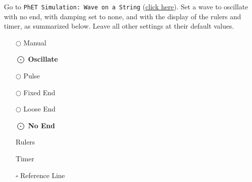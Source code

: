 \documentclass[../main-physics-problems.tex]{subfiles}
\begin{document}
\begin{questions}
\question
Go to \texttt{PhET Simulation: Wave on a String} (\href{https://phet.colorado.edu/sims/html/wave-on-a-string/latest/wave-on-a-string_all.html}{click here}). Set a wave to oscillate with no end, with damping set to none, and with the display of the rulers and timer, as summarized below. Leave all other settings at their default values.

\begin{center}
\begin{minipage}{0.15\textwidth}
\begin{itemize}
    \item[$\bigcirc$] Manual 
    \item[$\bigodot$] \textbf{Oscillate}
    \item[$\bigcirc$] Pulse
\end{itemize}
\end{minipage}%
\hspace{1ex}
\begin{minipage}{0.3\textwidth}
\centering
{}
\end{minipage}%
\hspace{1ex}
\begin{minipage}{0.15\textwidth}
\centering
\begin{itemize}
    \item[$\bigcirc$] Fixed End 
    \item[$\bigcirc$] Loose End
    \item[$\bigodot$] \textbf{No End}
\end{itemize}
\end{minipage}%
\hspace{1ex}
\begin{minipage}{0.2\textwidth}
\begin{itemize}
    \item[\checkbox{1}] Rulers
    \item[\checkbox{1}] Timer
    \item[$\square$] Reference Line
\end{itemize}
\end{minipage}
\end{center}


\end{questions}
\end{document}
